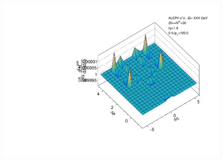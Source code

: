 \begin{figure}[htbp]
\begin{minipage}[b]{0.32\linewidth}
  \end{minipage}
  \begin{minipage}[b]{0.32\linewidth}
    \centering
    \includegraphics[width=\linewidth]{images/TwoParticleCorrelation/LEP1_THRUST/LEP1_THRUST_r_ratio_20_30.pdf}
    \label{fig:LEP1 Thrust Axis, Ratio Plot, Multiplicity 20-30, Ratio}
  \end{minipage}
\end{figure}

